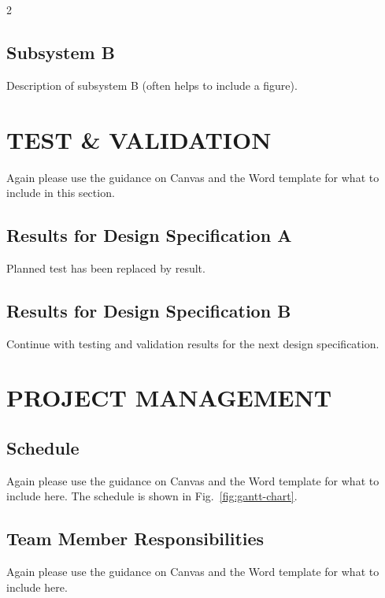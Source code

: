 \documentclass[10pt]{article}
\begin{document}
\begin{multicols*}{2}
\subsection{Subsystem B}
Description of subsystem B (often helps to include a figure).

\section{TEST \& VALIDATION} \label{test-validation}
Again please use the guidance on Canvas and the Word template for what to include in this section.

\subsection{{\color{red}Results} for Design Specification A}
Planned test {\color{red} has been replaced by result}.

\subsection{{\color{red}Results} for Design Specification B}
Continue with testing and validation results for the next design specification.

\section{PROJECT MANAGEMENT} \label{project-management}
\subsection{Schedule} \label{schedule}
Again please use the guidance on Canvas and the Word template for what to include here.
The schedule is shown in Fig.~\ref{fig:gantt-chart}.

\subsection{Team Member Responsibilities}
Again please use the guidance on Canvas and the Word template for what to include here.


\end{multicols*}
\end{document}

